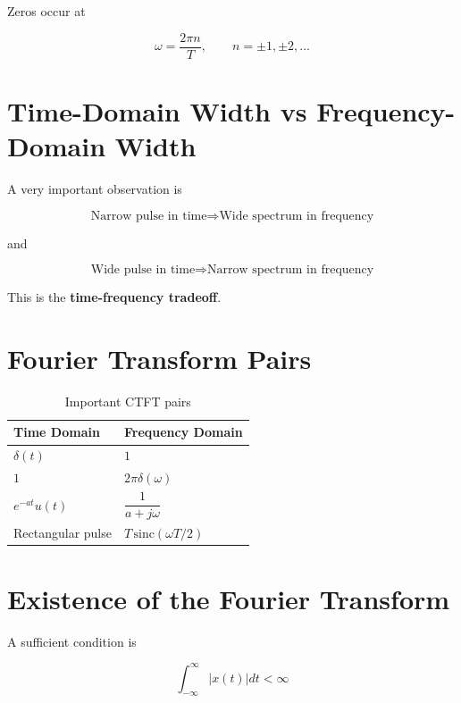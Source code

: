 Zeros occur at

\[
\boxed{
\omega=\frac{2\pi n}{T},
\qquad n=\pm1,\pm2,\ldots
}
\]


\section{Time-Domain Width vs Frequency-Domain Width}

A very important observation is

\[
\boxed{
\text{Narrow pulse in time}
\Rightarrow
\text{Wide spectrum in frequency}
}
\]

and

\[
\boxed{
\text{Wide pulse in time}
\Rightarrow
\text{Narrow spectrum in frequency}
}
\]

This is the \textbf{time-frequency tradeoff}.


\section{Fourier Transform Pairs}

\begin{table}[H]
\centering
\caption{Important CTFT pairs}
\begin{tabular}{|p{5cm}|p{6cm}|}
\hline
\textbf{Time Domain} & \textbf{Frequency Domain} \\
\hline
\(\delta(t)\) & \(1\) \\
\hline
\(1\) & \(2\pi\delta(\omega)\) \\
\hline
\(e^{-at}u(t)\) & \(\dfrac{1}{a+j\omega}\) \\
\hline
Rectangular pulse & \(T\,\mathrm{sinc}(\omega T/2)\) \\
\hline
\end{tabular}
\end{table}


\section{Existence of the Fourier Transform}

A sufficient condition is

\[
\boxed{
\int_{-\infty}^{\infty}|x(t)|dt<\infty
}
\]

